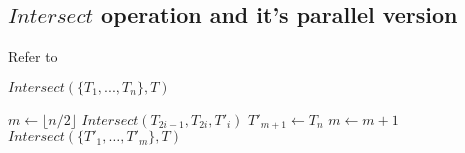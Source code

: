 \subsection{$Intersect$ operation and it's parallel version}

Refer to \cite{Dantsin:2003}

\PROCEDURE $Intersect(\{T_1, ..., T_n\}, T)$
\begin{algorithmic}[1]
	\STATE $m \gets \lfloor n/2 \rfloor$
  	\STATE $Intersect(T_{2i-1}, T_{2i}, T'_i)$
  \ENDFOR
    \STATE $T'_{m+1} \gets T_n$
    \STATE $m \gets m+1$
  \ENDIF
  \STATE $Intersect(\{T'_1, \dots, T'_m\}, T)$
\end{algorithmic}

